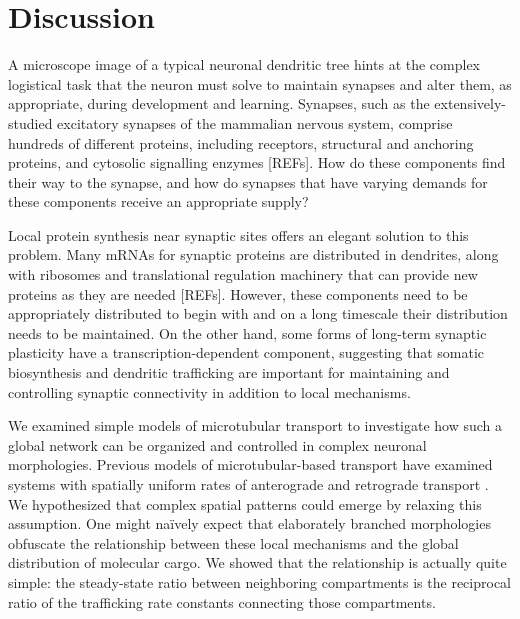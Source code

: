 \documentclass[10pt]{wlpeerj}
\begin{document}
\section*{Discussion}

A microscope image of a typical neuronal dendritic tree hints at the complex logistical task that the neuron must solve to maintain synapses and alter them, as appropriate, during development and learning. Synapses, such as the extensively-studied excitatory synapses of the mammalian nervous system, comprise hundreds of different proteins, including receptors, structural and anchoring proteins, and cytosolic signalling enzymes [REFs]. How do these components find their way to the synapse, and how do synapses that have varying demands for these components receive an appropriate supply?

Local protein synthesis near synaptic sites offers an elegant solution to this problem. Many mRNAs for synaptic proteins are distributed in dendrites, along with ribosomes and translational regulation machinery that can provide new proteins as they are needed [REFs]. However, these components need to be appropriately distributed to begin with and on a long timescale their distribution needs to be maintained. On the other hand, some forms of long-term synaptic plasticity have a transcription-dependent component, suggesting that somatic biosynthesis and dendritic trafficking are important for maintaining and controlling synaptic connectivity in addition to local mechanisms.

We examined simple models of microtubular transport to investigate how such a global network can be organized and controlled in complex neuronal morphologies. Previous models of microtubular-based transport have examined systems with spatially uniform rates of anterograde and retrograde transport \citep{Smith_2001,Bressloff_2006}. We hypothesized that complex spatial patterns could emerge by relaxing this assumption. One might na\"ively expect that elaborately branched morphologies obfuscate the relationship between these local mechanisms and the global distribution of molecular cargo. We showed that the relationship is actually quite simple: the steady-state ratio between neighboring compartments is the reciprocal ratio of the trafficking rate constants connecting those compartments.
\end{document}
